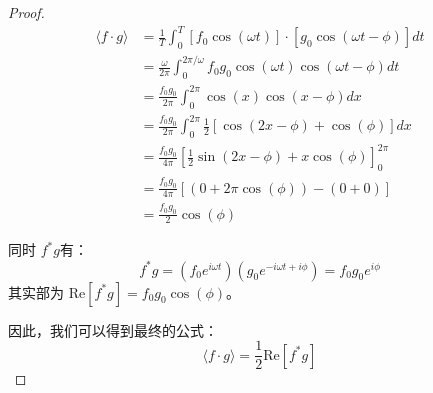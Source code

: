 \documentclass[fontset=none]{ctexart}
\begin{document}
\begin{proof}
\begin{equation}
    \begin{aligned}
    \langle f \cdot g \rangle &= \frac{1}{T} \int_{0}^{T} [f_0 \cos(\omega t)] 
    \cdot [g_0 \cos(\omega t - \phi)] dt \\
    &= \frac{\omega}{2\pi} \int_{0}^{2\pi/\omega} f_0 g_0 \cos(\omega t) \cos(\omega t - \phi) dt \\
    &= \frac{f_0 g_0}{2\pi} \int_{0}^{2\pi} \cos(x) \cos(x - \phi) dx \\
    &= \frac{f_0 g_0}{2\pi} \int_{0}^{2\pi} \frac{1}{2} [\cos(2x - \phi) + \cos(\phi)] dx \\
    &= \frac{f_0 g_0}{4\pi} \left[ \frac{1}{2}\sin(2x - \phi) + x\cos(\phi) \right]_{0}^{2\pi} \\
    &= \frac{f_0 g_0}{4\pi} [ (0 + 2\pi\cos(\phi)) - (0 + 0) ] \\
    &= \frac{f_0 g_0}{2} \cos(\phi)
\end{aligned}
\end{equation}

同时 $f^* g$有：
\begin{equation}
    f^* g = (f_0 e^{i\omega t})(g_0 e^{-i\omega t+i\phi}) = f_0 g_0 e^{i\phi}
\end{equation}
其实部为 $\mathrm{Re}[f^* g] = f_0 g_0 \cos(\phi)$。

因此，我们可以得到最终的公式：
\begin{equation}
    \langle f \cdot g \rangle = \frac{1}{2} \mathrm{Re}[f^* g]
\end{equation}
\end{proof}
\end{document}
